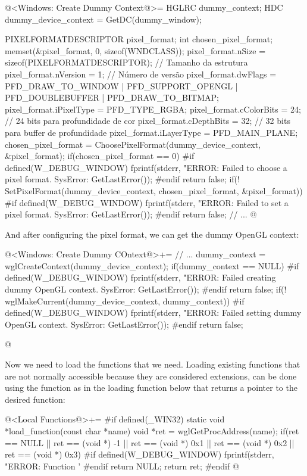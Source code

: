 \iniciocodigo
@<Windows: Create Dummy Context@>=
HGLRC dummy_context;
HDC dummy_device_context = GetDC(dummy_window);
{
  PIXELFORMATDESCRIPTOR pixel_format;
  int chosen_pixel_format;
  memset(&pixel_format, 0, sizeof(WNDCLASS));
  pixel_format.nSize = sizeof(PIXELFORMATDESCRIPTOR); // Tamanho da estrutura
  pixel_format.nVersion = 1; // Número de versão
  pixel_format.dwFlags = PFD_DRAW_TO_WINDOW | PFD_SUPPORT_OPENGL |
                         PFD_DOUBLEBUFFER | PFD_DRAW_TO_BITMAP;
  pixel_format.iPixelType = PFD_TYPE_RGBA;
  pixel_format.cColorBits = 24; // 24 bits para profundidade de cor
  pixel_format.cDepthBits = 32; // 32 bits para buffer de profundidade
  pixel_format.iLayerType = PFD_MAIN_PLANE;
  chosen_pixel_format = ChoosePixelFormat(dummy_device_context, &pixel_format);
  if(chosen_pixel_format == 0){
#if defined(W_DEBUG_WINDOW)
    fprintf(stderr, "ERROR: Failed to choose a pixel format. SysError: %
            GetLastError());
#endif
    return false;
  }
  if(! SetPixelFormat(dummy_device_context, chosen_pixel_format, &pixel_format)){
#if defined(W_DEBUG_WINDOW)
    fprintf(stderr, "ERROR: Failed to set a pixel format. SysError: %
            GetLastError());
#endif
    return false;
  }
  // ...
@
\fimcodigo

And after configuring the pixel format, we can get the dummy OpenGL
context:

\iniciocodigo
@<Windows: Create Dummy COntext@>+=
  // ...
  dummy_context = wglCreateContext(dummy_device_context);
  if(dummy_context == NULL){
#if defined(W_DEBUG_WINDOW)
    fprintf(stderr, "ERROR: Failed creating dummy OpenGL context. SysError: %
            GetLastError());
#endif
    return false;
  }
  if(! wglMakeCurrent(dummy_device_context, dummy_context)){
#if defined(W_DEBUG_WINDOW)
    fprintf(stderr, "ERROR: Failed setting dummy OpenGL context. SysError: %
            GetLastError());
#endif
    return false;
  }
}
@
\fimcodigo

Now we need to load the functions that we need. Loading existing
functions that are not normally accessible because they are considered
extensions, can be done using the
function  as in the loading function
below that returns a pointer to the desired function:

\iniciocodigo
@<Local Functions@>+=
#if defined(_WIN32)
static void *load_function(const char *name){
  void *ret = wglGetProcAddress(name);
  if(ret == NULL || ret == (void *) -1 || ret == (void *) 0x1 ||
     ret == (void *) 0x2 || ret == (void *) 0x3){
#if defined(W_DEBUG_WINDOW)
    fprintf(stderr, "ERROR: Function '%
#endif
    return NULL;
  }
  return ret;
}
#endif
@
\fimcodigo

